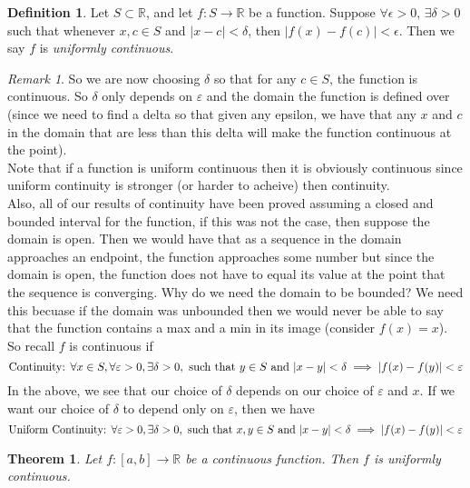\documentclass{article}
\newtheorem{theorem}{Theorem}[section]
\theoremstyle{definition}
\newtheorem{definition}{Definition}[section]
\theoremstyle{remark}
\newtheorem{remark}{Remark}[section]
\begin{document}
\begin{definition}\label{def:uniform continuity}
Let $S \subset \mathbb{R}$, and let $f : S \to \mathbb{R}$ be a function. Suppose $\forall \epsilon > 0$, $\exists \delta > 0$ such that whenever $x, c \in S$ and $|x - c| < \delta$, then $|f(x) - f(c)| < \epsilon$. Then we say $f$ is \emph{uniformly continuous}.
\end{definition}
\begin{remark}
So we are now choosing $\delta$ so that for any $c \in S$, the function is continuous. 
So $\delta$ only depends on $\varepsilon$ and the domain the function is defined over (since we need 
to find a delta so that given any epsilon, we have that any $x$ and $c$ in the domain that are 
less than this delta will make the function continuous at the point).\\
Note that if a function is uniform continuous then it is obviously
continuous since uniform continuity is stronger (or harder to acheive) then continuity.\\
Also, all of our results of continuity have been proved assuming a closed and bounded
interval for the function, if this was not the case, then suppose the domain is open. 
Then we would have that as a sequence in the domain approaches an endpoint, 
the function approaches some number but since the domain is open, the function does not have
to equal its value at the point that the sequence is converging. Why do we need the domain to be bounded? 
We need this becuase if the domain was unbounded then we would never be able to 
say that the function contains a max and a min in its image (consider $f(x) = x$).\\
So recall $f$ is continuous if \[
\textnormal{Continuity: } \forall x \in S, \forall \varepsilon > 0, \exists \delta > 0, \textnormal{ such that } y \in S \textnormal{ and } |x-y| < \delta \implies |f(x) - f(y)| < \varepsilon
\]
In the above, we see that our choice of $\delta$ depends on our choice of $\varepsilon$ and $x$. If we want our choice of 
$\delta$ to depend only on $\varepsilon$, then we have
\[
\textnormal{Uniform Continuity: } \forall \varepsilon > 0, \exists \delta > 0, \textnormal{ such that } x,y \in S \textnormal{ and } |x-y| < \delta \implies |f(x) - f(y)| < \varepsilon
\]

\end{remark}

\vspace{.5cm}

\begin{theorem}\label{thm:if cnts on closed and bdd then unif cnts}
Let $f : [a, b] \to \mathbb{R}$ be a continuous function. Then $f$ is uniformly continuous.
\end{theorem}
\end{document}
